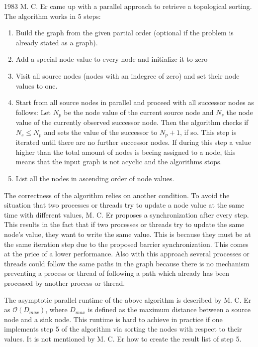  1983 M. C. Er \cite{er1983parallel} came up with a parallel approach to retrieve a topological sorting. The algorithm works in 5 steps:
 \begin{enumerate}
        \item Build the graph from the given partial order (optional if the problem is already stated as a graph).
        \item Add a special node value to every node and initialize it to zero
        \item Visit all source nodes (nodes with an indegree of zero) and set their node values to one.
        \item Start from all source nodes in parallel and proceed with all successor nodes as follows: Let $N_p$ be the node value of the current source node and $N_s$ the node value of the currently observed successor node. Then the algorithm checks if $N_s \leq N_p$ and sets the value of the successor to $N_p + 1$, if so. This step is iterated until there are no further successor nodes. If during this step a value higher than the total amount of nodes is beeing assigned to a node, this means that the input graph is not acyclic and the algorithms stops.
        \item List all the nodes in ascending order of node values.
 \end{enumerate}

The correctness of the algorithm relies on another condition. To avoid the situation that two processes or threads try to update a node value at the same time with different values, M. C. Er proposes a synchronization after every step. This results in the fact that if two processes or threads try to update the same node's value, they want to write the same value. This is because they must be at the same iteration step due to the proposed barrier synchronization. This comes at the price of a lower performance. Also with this approach several processes or threads could follow the same paths in the graph because there is no mechanism preventing a process or thread of following a path which already has been processed by another process or thread.

The asymptotic parallel runtime of the above algorithm is described by M. C. Er as $\mathcal{O}(D_{max})$, where $D_{max}$ is defined as the maximum distance between a source node and a sink node. This runtime is hard to achieve in practice if one implements step 5 of the algorithm via sorting the nodes with respect to their values. It is not mentioned by M. C. Er how to create the result list of step 5.


